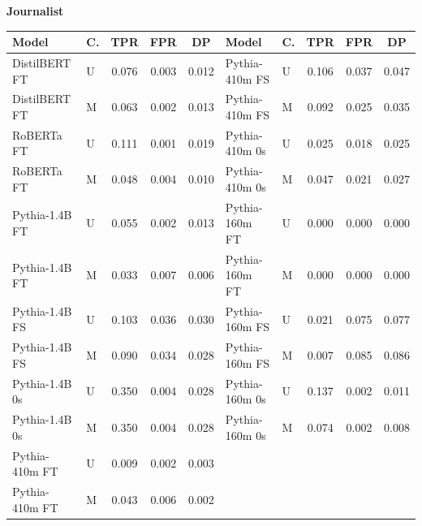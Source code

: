 \documentclass[11pt]{article}
\begin{document}
\vspace{4pt}\noindent\textbf{Journalist}
\begin{center}\scriptsize
\begin{tabular}{llccc|llccc}
\toprule
\textbf{Model} & \textbf{C.} & \textbf{TPR} & \textbf{FPR} & \textbf{DP} & \textbf{Model} & \textbf{C.} & \textbf{TPR} & \textbf{FPR} & \textbf{DP} \\
\midrule
DistilBERT FT & U & 0.076 & 0.003 & 0.012 & Pythia-410m FS & U & 0.106 & 0.037 & 0.047 \\
DistilBERT FT & M & 0.063 & 0.002 & 0.013 & Pythia-410m FS & M & 0.092 & 0.025 & 0.035 \\
RoBERTa FT & U & 0.111 & 0.001 & 0.019 & Pythia-410m 0s & U & 0.025 & 0.018 & 0.025 \\
RoBERTa FT & M & 0.048 & 0.004 & 0.010 & Pythia-410m 0s & M & 0.047 & 0.021 & 0.027 \\
Pythia-1.4B FT & U & 0.055 & 0.002 & 0.013 & Pythia-160m FT & U & 0.000 & 0.000 & 0.000 \\
Pythia-1.4B FT & M & 0.033 & 0.007 & 0.006 & Pythia-160m FT & M & 0.000 & 0.000 & 0.000 \\
Pythia-1.4B FS & U & 0.103 & 0.036 & 0.030 & Pythia-160m FS & U & 0.021 & 0.075 & 0.077 \\
Pythia-1.4B FS & M & 0.090 & 0.034 & 0.028 & Pythia-160m FS & M & 0.007 & 0.085 & 0.086 \\
Pythia-1.4B 0s & U & 0.350 & 0.004 & 0.028 & Pythia-160m 0s & U & 0.137 & 0.002 & 0.011 \\
Pythia-1.4B 0s & M & 0.350 & 0.004 & 0.028 & Pythia-160m 0s & M & 0.074 & 0.002 & 0.008 \\
Pythia-410m FT & U & 0.009 & 0.002 & 0.003 & & & & & \\
Pythia-410m FT & M & 0.043 & 0.006 & 0.002 & & & & & \\
\bottomrule
\end{tabular}
\end{center}
\end{document}
